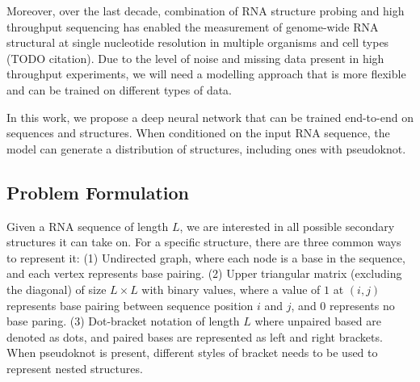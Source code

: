 \documentclass{article}
\begin{document}
Moreover, over the last decade,
combination of RNA structure probing and high throughput sequencing has enabled
the measurement of genome-wide RNA structural at single nucleotide resolution in multiple organisms and cell types (TODO citation).
Due to the level of noise and missing data present in high throughput experiments,
we will need a modelling approach that is more flexible and can be trained on different types of data.
%

In this work, we propose a deep neural network that can be trained end-to-end on
sequences and structures. When conditioned on the input RNA sequence,
the model can generate a distribution of structures, including ones with pseudoknot.

%
%

\subsection{Problem Formulation}

Given a RNA sequence of length $L$, we are interested in all possible secondary structures it can take on.
For a specific structure, there are three common ways to represent it:
(1) Undirected graph, where each node is a base in the sequence, and each vertex represents base pairing.
(2) Upper triangular matrix (excluding the diagonal)
of size $L \times L$ with binary values, where a value of $1$ at $(i, j)$ represents
base pairing between sequence position $i$ and $j$, and $0$ represents no base paring.
(3) Dot-bracket notation of length $L$ where unpaired based are denoted as dots,
    and paired bases are represented as left and right brackets.
When pseudoknot is present, different styles of bracket needs to be used to represent nested structures.


%
%
%
%
\end{document}
